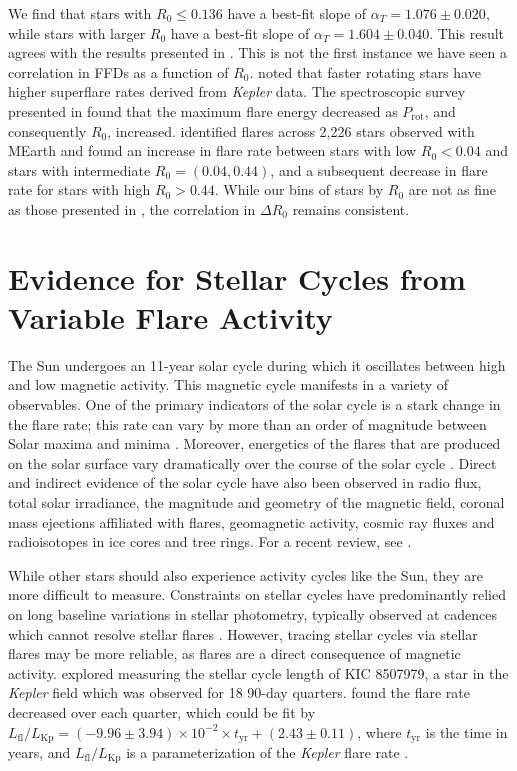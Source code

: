 \documentclass[twocolumn]{aastex631}
\begin{document}
We find that stars with $R_0 \leq 0.136$ have a best-fit slope of
$\alpha_T = 1.076 \pm 0.020$, while stars with larger $R_0$ have a best-fit slope
of $\alpha_T = 1.604 \pm 0.040$. This result agrees with the results presented in
\cite{seligman22}. This is not the first instance we have seen a correlation in FFDs
as a function of $R_0$. \cite{candelaresi14} noted that faster rotating stars have
higher superflare rates derived from \textit{Kepler} data. The spectroscopic survey
presented in \cite{notsu19} found that the maximum flare energy decreased as
$P_\textrm{rot}$, and consequently $R_0$, increased. \cite{mondrik19} identified
flares across 2,226 stars observed with MEarth and found an increase in flare rate
between stars with low $R_0 < 0.04$ and stars with intermediate $R_0 = (0.04, 0.44)$,
and a subsequent decrease in flare rate for stars with high $R_0 > 0.44$. While our
bins of stars by $R_0$ are not as fine as those presented in \cite{mondrik19}, the
correlation in $\Delta R_0$ remains consistent.


\section{Evidence for Stellar Cycles from Variable Flare Activity}\label{sec:cycles}

The Sun undergoes an 11-year solar cycle during  which it oscillates between high and
low magnetic activity. This magnetic cycle manifests  in a variety of observables. One
of the primary indicators of the solar cycle is a stark change in the flare rate; this
rate can vary by more than an order of magnitude between Solar maxima and minima
\citep{webb94}. Moreover, energetics of the flares that are produced on the solar
surface vary dramatically over the course of the solar cycle \citep{Bai1987,Bai2003}.
Direct and indirect evidence  of the solar cycle have also been observed in radio flux,
total solar irradiance, the magnitude and geometry of the magnetic field, coronal
mass ejections affiliated with flares, geomagnetic activity, cosmic ray fluxes and
radioisotopes in ice cores and tree rings. For a recent review, see \citet{Hathaway2015}.


While other stars should also experience activity cycles like the Sun, they are
more difficult to measure. Constraints on stellar cycles have
predominantly relied on long baseline variations in stellar photometry, typically
observed at cadences which cannot resolve stellar flares \citep[see recent reviews
by ][]{jeffers23, isik23}. However,  tracing stellar cycles via stellar flares may
be more reliable, as flares are a direct consequence of magnetic activity. \cite{scoggins19}
explored measuring the stellar cycle length of KIC 8507979, a star in the \textit{Kepler}
field which was observed for 18 90-day quarters. \cite{scoggins19} found the flare rate
decreased over each quarter, which could be fit by
$L_\textrm{fl}/L_\textrm{Kp} = (-9.96 \pm 3.94) \times 10^{-2} \times t_\textrm{yr} + (2.43 \pm 0.11)$,
where $t_\textrm{yr}$ is the time in years, and $L_\textrm{fl}/L_\textrm{Kp}$ is
a parameterization of the \textit{Kepler} flare rate \citep{lurie15}.
\end{document}

